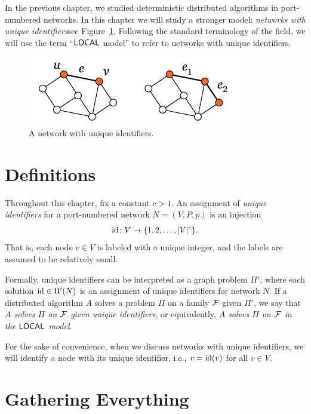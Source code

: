 

\noindent
In the previous chapter, we studied deterministic distributed algorithms in port-numbered networks. In this chapter we will study a stronger model: \emph{networks with unique identifiers}\mydash see Figure~\ref{fig:unique-ids}. Following the standard terminology of the field, we will use the term ``$\textup{\sffamily LOCAL}$ model'' to refer to networks with unique identifiers.

\begin{figure}
    \centering
    \includegraphics[page=\PUniqueIds]{figs.pdf}
    \caption{A network with unique identifiers.}\label{fig:unique-ids}
\end{figure}


\section{Definitions}\label{sec:unique-id}

Throughout this chapter, fix a constant $c > 1$. An assignment of \emph{unique identifiers} for a port-numbered network $N = (V,P,p)$ is an injection
\[
    \operatorname{id} \colon V \to \{1,2, \dotsc, |V|^c\}.
\]
That is, each node $v \in V$ is labeled with a unique integer, and the labels are assumed to be relatively small.

Formally, unique identifiers can be interpreted as a graph problem $\Pi'$, where each solution $\operatorname{id} \in \Pi'(N)$ is an assignment of unique identifiers for network $N$. If a distributed algorithm $A$ solves a problem $\Pi$ on a family $\mathcal{F}$ given $\Pi'$, we say that \emph{$A$ solves $\Pi$ on $\mathcal{F}$ given unique identifiers}, or equivalently, \emph{$A$ solves $\Pi$ on $\mathcal{F}$ in the $\textup{\sffamily LOCAL}$ model}.

For the sake of convenience, when we discuss networks with unique identifiers, we will identify a node with its unique identifier, i.e., $v = \operatorname{id}(v)$ for all $v \in V$.


\section{Gathering Everything}\label{sec:gather}

